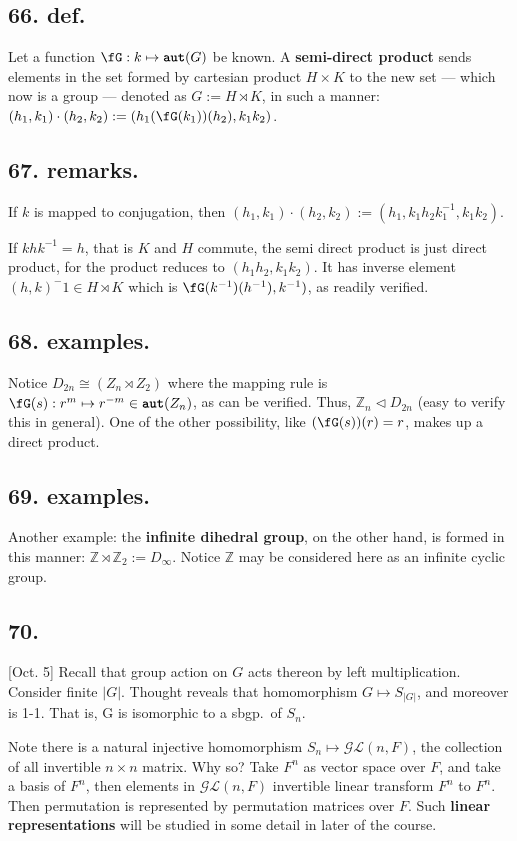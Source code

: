 \documentclass[12pt]{article}
\newcommand\oo\infty%
\newcommand\M\cdot%
\newcommand\X\times%
\newcommand\Mp\mapsto%
\newcommand{\BF}[1]{ \mathbb{#1} }%
\newcommand{\CF}[1]{ \mathcal{#1} }%
\newcommand{\Ss}[1]{\textsf{\textbf{#1}}}%
\newcommand{\Tw}[1]{\texttt{\textbf{#1}}}%
\begin{document}
\subsection*{66. def.} Let a function \(\fG: k \Mp \Tw{aut}(G)\) be known. 
A \Ss{semi-direct product} sends elements in the set formed by cartesian product \(H \X K\) to the new set --- which now is a group --- denoted as \(G := H \rtimes K\), 
in such a manner: \((h_1, k_1) \M (h_2, k_2) := (h_1 (\fG(k_1))(h_2), k_1 k_2)\). \par

\subsection*{67. remarks.} If \(k\) is mapped to conjugation, then \((h_1, k_1) \M (h_2, k_2) := (h_1, k_1 h_2 k_1^{-1}, k_1 k_2)\). \par
If \(khk^{-1} = h\), that is \(K\) and \(H\) commute, the semi direct product is just direct product, for the product reduces to \((h_1 h_2, k_1 k_2)\). 
It has inverse element \((h,k)^-1 \in H \rtimes K\) which is \(\fG(k^{-1})(h^{-1}), k^{-1})\), as readily verified. 

\subsection*{68. examples.} Notice \(D_{2n} \cong (Z_n \rtimes Z_2)\) where the mapping rule is \(\fG(s): r^m \Mp r^{-m} \in \Tw{aut}(Z_n)\), as can be verified. 
Thus, \(\BF Z_n \lhd D_{2n}\) (easy to verify this in general). 
One of the other possibility, like \((\fG(s))(r) = r\), makes up a direct product. 

\subsection*{69. examples.} Another example: the \Ss{infinite dihedral group}, on the other hand, is formed in this manner: \(\BF Z \rtimes \BF Z_2 := D_\oo\). 
Notice \(\BF Z\) may be considered here as an infinite cyclic group. 

\subsection*{70.} [Oct. 5] Recall that group action on \(G\) acts thereon by left multiplication. 
Consider finite \(|G|\). Thought reveals that homomorphism \(G \Mp S_{|G|}\), and moreover is 1-1. 
That is, G is isomorphic to a sbgp.\ of \(S_n\). \par
Note there is a natural injective homomorphism \(S_n \Mp \CF{GL}(n,F)\), the collection of all invertible \(n \X n\) matrix. 
Why so? Take \(F^n\) as vector space over \(F\), and take a basis of \(F^n\), then elements in \(\CF{GL}(n,F)\) invertible linear transform \(F^n\) to \(F^n\). 
Then permutation is represented by permutation matrices over \(F\). 
Such \Ss{linear representations} will be studied in some detail in later of the course. 
\end{document}
